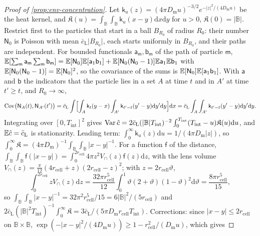\begin{proof}[Proof of \cref{prop:env-concentration}]
Let $\mathsf k_u(z)=(4\pi D_{\mathrm m}u)^{-3/2}e^{-\lvert z\rvert^2/(4D_{\mathrm m}u)}$ be the heat kernel, and $\mathfrak K(u)=\int_{\mathbb B}\int_{\mathbb B}\mathsf k_u(x-y)\mathrm dx\mathrm dy$ for $u>0$, $\mathfrak K(0)=\lvert\mathbb B\rvert$. Restrict first to the particles that start in a ball $B_{R_0}$ of radius $R_0$: their number $\mathsf N_0$ is Poisson with mean $\bar c_{\mathrm L}\lvert B_{R_0}\rvert$, each starts uniformly in $B_{R_0}$, and their paths are independent. For bounded functionals $\mathsf a_{\mathsf m},\mathsf b_{\mathsf m}$ of the path of particle $\mathsf m$, $\mathbb{E}[\sum_{\mathsf m}\mathsf a_{\mathsf m}\sum_{\mathsf m}\mathsf b_{\mathsf m}]=\mathbb{E}[\mathsf N_0]\mathbb{E}[\mathsf a_1\mathsf b_1]+\mathbb{E}[\mathsf N_0(\mathsf N_0-1)]\mathbb{E}\mathsf a_1\mathbb{E}\mathsf b_1$ with $\mathbb{E}[\mathsf N_0(\mathsf N_0-1)]=\mathbb{E}[\mathsf N_0]^2$, so the covariance of the sums is $\mathbb{E}[\mathsf N_0]\mathbb{E}[\mathsf a_1\mathsf b_1]$. With $\mathsf a$ and $\mathsf b$ the indicators that the particle lies in a set $A$ at time $t$ and in $A'$ at time $t'\ge t$, and $R_0\to\infty$,
\[
\operatorname{Cov}\bigl(\mathsf N_A(t),\mathsf N_{A'}(t')\bigr)=\bar c_{\mathrm L}\int\Bigl[\int_A\mathsf k_t(y-x)\int_{A'}\mathsf k_{t'-t}(y'-y)\mathrm dy'\mathrm dy\Bigr]\mathrm dx=\bar c_{\mathrm L}\int_A\int_{A'}\mathsf k_{t'-t}(y'-y)\mathrm dy'\mathrm dy.
\]
Integrating over $[0,T_{\mathrm{int}}]^2$ gives $\operatorname{Var}\hat c=2\bar c_{\mathrm L}(\lvert\mathbb B\rvert T_{\mathrm{int}})^{-2}\int_0^{T_{\mathrm{int}}}(T_{\mathrm{int}}-u)\mathfrak K(u)\mathrm du$, and $\mathbb{E}\hat c=\bar c_{\mathrm L}$ is stationarity. Leading term: $\int_0^\infty\mathsf k_u(z)\mathrm du=1/(4\pi D_{\mathrm m}\lvert z\rvert)$, so $\int_0^\infty\mathfrak K=(4\pi D_{\mathrm m})^{-1}\int_{\mathbb B}\int_{\mathbb B}\lvert x-y\rvert^{-1}$. For a function $\mathsf f$ of the distance, $\int_{\mathbb B}\int_{\mathbb B}\mathsf f(\lvert x-y\rvert)=\int_0^{2r_{\mathrm{cell}}}4\pi z^2V_\cap(z)\mathsf f(z)\mathrm dz$, with the lens volume $V_\cap(z)=\frac\pi{12}(4r_{\mathrm{cell}}+z)(2r_{\mathrm{cell}}-z)^2$; with $z=2r_{\mathrm{cell}}\vartheta$,
\[
\int_0^{2r_{\mathrm{cell}}}zV_\cap(z)\mathrm dz=\frac{32\pi r_{\mathrm{cell}}^5}{12}\int_0^1\vartheta(2+\vartheta)(1-\vartheta)^2\mathrm d\vartheta=\frac{8\pi r_{\mathrm{cell}}^5}{15},
\]
so $\int_{\mathbb B}\int_{\mathbb B}\lvert x-y\rvert^{-1}=32\pi^2r_{\mathrm{cell}}^5/15=6\lvert\mathbb B\rvert^2/(5r_{\mathrm{cell}})$ and $2\bar c_{\mathrm L}(\lvert\mathbb B\rvert^2T_{\mathrm{int}})^{-1}\int_0^\infty\mathfrak K=3\bar c_{\mathrm L}/(5\pi D_{\mathrm m}r_{\mathrm{cell}}T_{\mathrm{int}})$. Corrections: since $\lvert x-y\rvert\le2r_{\mathrm{cell}}$ on $\mathbb B\times\mathbb B$, $\exp(-\lvert x-y\rvert^2/(4D_{\mathrm m}u))\ge1-r_{\mathrm{cell}}^2/(D_{\mathrm m}u)$, which gives

\end{proof}
